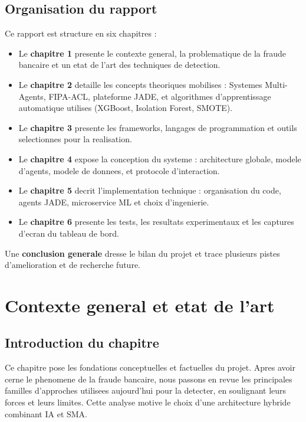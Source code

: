 \documentclass[12pt,a4paper,oneside]{report}
\begin{document}
\section*{Organisation du rapport}

Ce rapport est structure en six chapitres :

\begin{itemize}[leftmargin=*]
  \item Le \textbf{chapitre 1} presente le contexte general, la problematique
        de la fraude bancaire et un etat de l'art des techniques de detection.
  \item Le \textbf{chapitre 2} detaille les concepts theoriques mobilises :
        Systemes Multi-Agents, FIPA-ACL, plateforme JADE, et algorithmes
        d'apprentissage automatique utilises (XGBoost, Isolation Forest, SMOTE).
  \item Le \textbf{chapitre 3} presente les frameworks, langages de
        programmation et outils selectionnes pour la realisation.
  \item Le \textbf{chapitre 4} expose la conception du systeme : architecture
        globale, modele d'agents, modele de donnees, et protocole d'interaction.
  \item Le \textbf{chapitre 5} decrit l'implementation technique : organisation
        du code, agents JADE, microservice ML et choix d'ingenierie.
  \item Le \textbf{chapitre 6} presente les tests, les resultats experimentaux
        et les captures d'ecran du tableau de bord.
\end{itemize}

Une \textbf{conclusion generale} dresse le bilan du projet et trace plusieurs
pistes d'amelioration et de recherche future.

\chapter{Contexte general et etat de l'art}

\section{Introduction du chapitre}
Ce chapitre pose les fondations conceptuelles et factuelles du projet. Apres
avoir cerne le phenomene de la fraude bancaire, nous passons en revue les
principales familles d'approches utilisees aujourd'hui pour la detecter, en
soulignant leurs forces et leurs limites. Cette analyse motive le choix d'une
architecture hybride combinant IA et SMA.
\end{document}
